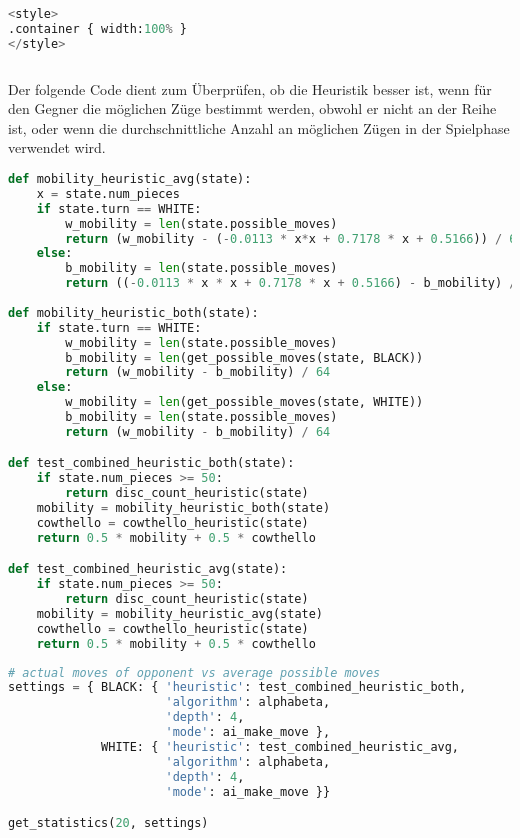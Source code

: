 \begin{lstlisting}[language=Python]
%%HTML
<style>
.container { width:100% }
</style>
\end{lstlisting}

\begin{lstlisting}[language=Python]
%run othello_test_util.ipynb
\end{lstlisting}

Der folgende Code dient zum Überprüfen, ob die Heuristik besser ist,
wenn für den Gegner die möglichen Züge bestimmt werden, obwohl er nicht
an der Reihe ist, oder wenn die durchschnittliche Anzahl an möglichen
Zügen in der Spielphase verwendet wird.

\begin{lstlisting}[language=Python]
def mobility_heuristic_avg(state):
    x = state.num_pieces
    if state.turn == WHITE:
        w_mobility = len(state.possible_moves)
        return (w_mobility - (-0.0113 * x*x + 0.7178 * x + 0.5166)) / 64
    else:
        b_mobility = len(state.possible_moves)
        return ((-0.0113 * x * x + 0.7178 * x + 0.5166) - b_mobility) / 64
    
def mobility_heuristic_both(state):
    if state.turn == WHITE:
        w_mobility = len(state.possible_moves)
        b_mobility = len(get_possible_moves(state, BLACK))
        return (w_mobility - b_mobility) / 64
    else:
        w_mobility = len(get_possible_moves(state, WHITE))
        b_mobility = len(state.possible_moves)
        return (w_mobility - b_mobility) / 64

def test_combined_heuristic_both(state):
    if state.num_pieces >= 50:
        return disc_count_heuristic(state)
    mobility = mobility_heuristic_both(state)
    cowthello = cowthello_heuristic(state)
    return 0.5 * mobility + 0.5 * cowthello

def test_combined_heuristic_avg(state):
    if state.num_pieces >= 50:
        return disc_count_heuristic(state)
    mobility = mobility_heuristic_avg(state)
    cowthello = cowthello_heuristic(state)
    return 0.5 * mobility + 0.5 * cowthello
\end{lstlisting}

\begin{lstlisting}[language=Python]
# actual moves of opponent vs average possible moves
settings = { BLACK: { 'heuristic': test_combined_heuristic_both,
                      'algorithm': alphabeta,
                      'depth': 4,
                      'mode': ai_make_move },
             WHITE: { 'heuristic': test_combined_heuristic_avg,
                      'algorithm': alphabeta,
                      'depth': 4,
                      'mode': ai_make_move }}

get_statistics(20, settings)
\end{lstlisting}

